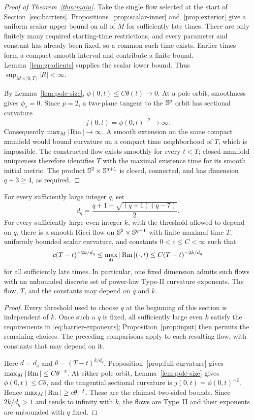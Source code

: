 \begin{proof}[Proof of Theorem~\ref{thm:main}]
Take the single flow selected at the start of Section~\ref{sec:barriers}.
Propositions~\ref{prop:scalar-inner} and~\ref{prop:exterior} give a
uniform scalar upper bound on all of \(M\) for sufficiently late times.
There are only finitely many required starting-time restrictions, and
every parameter and constant has already been fixed, so a common such
time exists. Earlier times form a compact smooth interval and contribute
a finite bound. Lemma~\ref{lem:gradients} supplies the scalar lower bound.
Thus \(\sup_{M\times[0,T)}|R|<\infty\).

By Lemma~\ref{lem:pole-size}, \(\phi(0,t)\le C\theta(t)\to0\).
At a pole orbit, smoothness gives \(\phi_s=0\). Since \(p=2\), a
two-plane tangent to the \(\mathbb S^p\) orbit has sectional curvature
\[
j(0,t)=\phi(0,t)^{-2}\longrightarrow\infty.
\]
Consequently \(\max_M|\operatorname{Rm}|\to\infty\). A smooth extension on the same
compact manifold would bound curvature on a compact time neighborhood
of \(T\), which is impossible. The constructed flow exists smoothly for
every \(t<T\); closed-manifold uniqueness therefore identifies \(T\)
with the maximal existence time for its smooth initial metric. The product
\(\mathbb S^2\times\mathbb S^{q+1}\) is closed, connected, and has dimension
\(q+3\ge4\), as required.
\end{proof}

\begin{corollary}\label{cor:rates}
For every sufficiently large integer \(q\), set
\[
d_q=\frac{q+1-\sqrt{(q+1)(q-7)}}2.
\]
For every sufficiently large even integer \(k\), with the threshold
allowed to depend on \(q\), there is a smooth Ricci flow on
\(\mathbb S^2\times\mathbb S^{q+1}\) with finite maximal time \(T\), uniformly
bounded scalar curvature, and constants \(0<c\le C<\infty\) such that
\[
c(T-t)^{-2k/d_q}\le\max_M|\operatorname{Rm}|(\cdot,t)
\le C(T-t)^{-2k/d_q}
\]
for all sufficiently late times. In particular, one fixed dimension
admits such flows with an unbounded discrete set of power-law Type-II
curvature exponents. The flow, \(T\), and the constants may depend on
\(q\) and \(k\).
\end{corollary}

\begin{proof}
Every threshold used to choose \(q\) at the beginning of this section
is independent of \(k\). Once such a \(q\) is fixed, all sufficiently
large even \(k\) satisfy the requirements in
\eqref{eq:barrier-exponents}; Proposition~\ref{prop:input} then permits
the remaining choices. The preceding comparisons apply to each resulting
flow, with constants that may depend on it.

Here \(d=d_q\) and \(\theta=(T-t)^{k/d_q}\).
Proposition~\ref{prop:full-curvature} gives
\(\max_M|\operatorname{Rm}|\le C\theta^{-2}\).
At either pole orbit, Lemma~\ref{lem:pole-size} gives
\(\phi(0,t)\le C\theta\), and the tangential sectional curvature is
\(j(0,t)=\phi(0,t)^{-2}\). Hence
\(\max_M|\operatorname{Rm}|\ge c\theta^{-2}\).
These are the claimed two-sided bounds. Since \(2k/d_q>1\) and tends
to infinity with \(k\), the flows are Type~II and their exponents are
unbounded with \(q\) fixed.
\end{proof}
